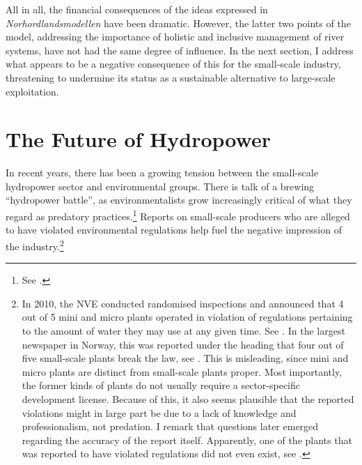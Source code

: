 
All in all, the financial consequences of the ideas expressed in {\it Norhordlandsmodellen} have been dramatic. However, the latter two points of the model, addressing the importance of holistic and inclusive management of river systems, have not had the same degree of influence. In the next section, I address what appears to be a negative consequence of this for the small-scale industry, threatening to undermine its status as a sustainable alternative to large-scale exploitation.

\section{The Future of Hydropower}\label{sec:4:6}

In recent years, there has been a growing tension between the small-scale hydropower sector and environmental groups. There is talk of a brewing ``hydropower battle'', as environmentalists grow increasingly critical of what they regard as predatory practices.\footnote{See \cite{haltbrekken12}.}
Reports on small-scale producers who are alleged to have violated environmental regulations help fuel the negative impression of the industry.\footnote{In 2010, the NVE conducted randomised inspections and announced that 4 out of 5 mini and micro plants operated in violation of regulations pertaining to the amount of water they may use at any given time. See \cite{ulovlig10}. In the largest newspaper in Norway, this was reported under the heading that four out of five small-scale plants break the law, see \cite{ulovlig10b}. This is misleading, since mini and micro plants are distinct from small-scale plants proper. Most importantly, the former kinds of plants do not usually require a sector-specific development license. Because of this, it also seems plausible that the reported violations might in large part be due to a lack of knowledge and professionalism, not predation. I remark that questions later emerged regarding the accuracy of the report itself. Apparently, one of the plants that was reported to have violated regulations did not even exist, see \cite{tvilsom10}.}


